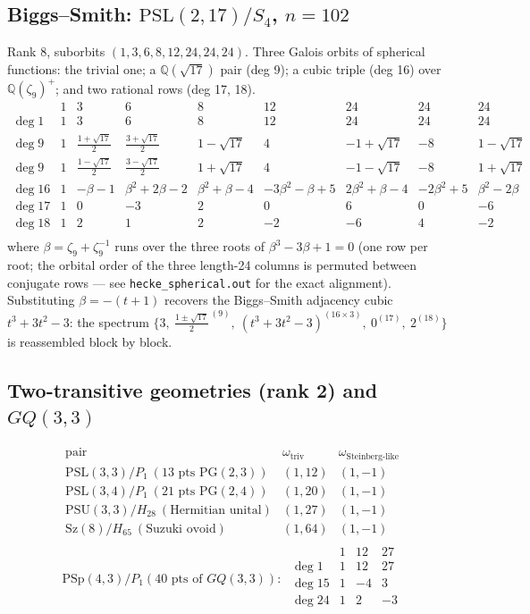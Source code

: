 \documentclass[11pt]{article}
\theoremstyle{remark}
\newcommand{\Q}{\mathbb{Q}}
\begin{document}
\subsection{Biggs--Smith: $\mathrm{PSL}(2,17)/S_4$, $n=102$}

Rank 8, suborbits $(1,3,6,8,12,24,24,24)$. Three Galois orbits of
spherical functions: the trivial one; a $\Q(\sqrt{17})$ pair (deg 9);
a cubic triple (deg 16) over $\Q(\zeta_9)^+$; and two rational rows
(deg 17, 18).
\[
\begin{array}{l|rrrrrrrr}
 & 1 & 3 & 6 & 8 & 12 & 24 & 24 & 24\\
\hline
\deg 1 & 1 & 3 & 6 & 8 & 12 & 24 & 24 & 24\\
\deg 9 & 1 & \frac{1+\sqrt{17}}{2} & \frac{3+\sqrt{17}}{2} & 1-\sqrt{17} & 4 & -1+\sqrt{17} & -8 & 1-\sqrt{17}\\[2pt]
\deg 9 & 1 & \frac{1-\sqrt{17}}{2} & \frac{3-\sqrt{17}}{2} & 1+\sqrt{17} & 4 & -1-\sqrt{17} & -8 & 1+\sqrt{17}\\[2pt]
\deg 16 & 1 & -\beta-1 & \beta^2+2\beta-2 & \beta^2+\beta-4 & -3\beta^2-\beta+5 & 2\beta^2+\beta-4 & -2\beta^2+5 & \beta^2-2\beta\\
\deg 17 & 1 & 0 & -3 & 2 & 0 & 6 & 0 & -6\\
\deg 18 & 1 & 2 & 1 & 2 & -2 & -6 & 4 & -2\\
\end{array}
\]
where $\beta=\zeta_9+\zeta_9^{-1}$ runs over the three roots of
$\beta^3-3\beta+1=0$ (one row per root; the orbital order of the three
length-24 columns is permuted between conjugate rows --- see
\texttt{hecke\_spherical.out} for the exact alignment). Substituting
$\beta=-(t+1)$ recovers the Biggs--Smith adjacency cubic $t^3+3t^2-3$:
the spectrum
$\{3,\ \tfrac{1\pm\sqrt{17}}{2}^{\,(9)},\ (t^3+3t^2-3)^{(16\times3)},\
0^{(17)},\ 2^{(18)}\}$ is reassembled block by block.

\subsection{Two-transitive geometries (rank 2) and $GQ(3,3)$}

\[
\begin{array}{l|cc}
\text{pair} & \omega_{\text{triv}} & \omega_{\text{Steinberg-like}}\\
\hline
\mathrm{PSL}(3,3)/P_1\ (13 \text{ pts } \mathrm{PG}(2,3)) & (1,12) & (1,-1)\\
\mathrm{PSL}(3,4)/P_1\ (21 \text{ pts } \mathrm{PG}(2,4)) & (1,20) & (1,-1)\\
\mathrm{PSU}(3,3)/H_{28}\ (\text{Hermitian unital}) & (1,27) & (1,-1)\\
\mathrm{Sz}(8)/H_{65}\ (\text{Suzuki ovoid}) & (1,64) & (1,-1)\\
\end{array}
\]
\[
\textbf{$\mathrm{PSp}(4,3)/P_1$} (40 \text{ pts of } GQ(3,3)):\;
\begin{array}{l|rrr}
 & 1 & 12 & 27\\
\hline
\deg 1 & 1 & 12 & 27\\
\deg 15 & 1 & -4 & 3\\
\deg 24 & 1 & 2 & -3\\
\end{array}
\]
\end{document}
